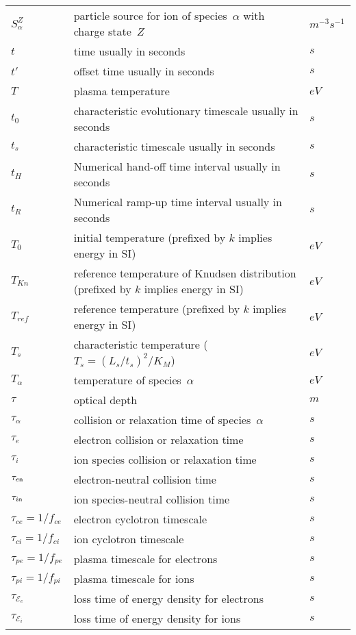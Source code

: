 \begin{longtable}{|p{3.0cm}|p{10.0cm}|p{3.0cm}|}
$S^Z_\alpha$ & particle source for ion of species~$\alpha$ with charge state~$Z$  & $m^{-3} s^{-1}$ \\
$t$ & time usually in seconds  & $s$ \\
$t'$ & offset time usually in seconds  & $s$ \\
$T$ & plasma temperature  & $eV$ \\
$t_0$ & characteristic evolutionary timescale usually in seconds  & $s$ \\
$t_s$ & characteristic timescale usually in seconds  & $s$ \\
$t_H$ & Numerical hand-off time interval usually in seconds  & $s$ \\
$t_R$ & Numerical ramp-up time interval usually in seconds  & $s$ \\
$T_0$ & initial temperature (prefixed by $k$ implies energy in SI)  & $eV$ \\
$T_{Kn}$ & reference temperature of Knudsen distribution (prefixed by $k$ implies energy in SI)  & $eV$ \\
$T_{ref}$ & reference temperature (prefixed by $k$ implies energy in SI)  & $eV$ \\
$T_s$ & characteristic temperature ($T_s=(L_s/t_s)^2/K_M$)  & $eV$ \\
$T_\alpha$ & temperature of species~$\alpha$  & $eV$ \\
$\tau$ & optical depth  & $m$ \\
$\tau_\alpha$ & collision or relaxation time of species~$\alpha$   & $s$ \\
$\tau_e$ & electron collision or relaxation time   & $s$ \\
$\tau_i$ & ion species collision or relaxation time   & $s$ \\
$\tau_{e{\sf n}} $ & electron-neutral collision time   & $s$ \\
$\tau_{i{\sf n}} $ & ion species-neutral collision time   & $s$ \\
$\tau_{ce}=1/f_{ce}$ & electron cyclotron timescale & $s$ \\
$\tau_{ci}=1/f_{ci}$ & ion cyclotron timescale & $s$ \\
$\tau_{pe}=1/f_{pe}$ & plasma timescale for electrons & $s$ \\
$\tau_{pi}=1/f_{pi}$ & plasma timescale for ions & $s$ \\
$\tau_{\mathcal{E}_e}$ & loss time of energy density for electrons   & $s$ \\
$\tau_{\mathcal{E}_i}$ & loss time of energy density for ions   & $s$ \\

\end{longtable}
